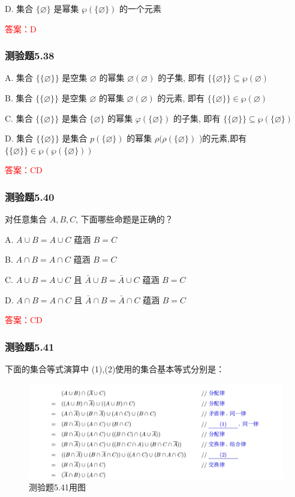 \documentclass[UTF8, heading=true]{ctexart}
\begin{document}
D. 
集合 $\{\varnothing\}$ 是幂集 $\wp(\{\varnothing\})$ 的一个元素

\textcolor{red}{答案：D}

\subsubsection{测验题5.38}
A. 
集合 $\{\{\varnothing\}\}$ 是空集 $\varnothing$ 的幂集 $\varnothing(\varnothing)$ 的子集, 即有 $\{\{\varnothing\}\} \subseteq \wp(\varnothing)$

B. 
集合 $\{\{\varnothing\}\}$ 是空集 $\varnothing$ 的幂集 $\varnothing(\varnothing)$ 的元素, 即有 $\{\{\varnothing\}\} \in \wp(\varnothing)$

C. 
集合 $\{\{\varnothing\}\}$ 是集合 $\{\varnothing\}$ 的幂集 $\varphi(\{\varnothing\})$ 的子集, 即有 $\{\{\varnothing\}\} \subseteq \wp(\{\varnothing\})$

D. 
集合 $\{\{\varnothing\}\}$ 是集合 $p(\{\varnothing\})$ 的幂集 $\rho(\rho(\{\varnothing\})$ )的元素,即有 $\{\{\varnothing\}\} \in \wp(\wp(\{\varnothing\}))$

\textcolor{red}{答案：CD}

\subsubsection{测验题5.40}
对任意集合 $A, B, C$, 下面哪些命题是正确的？

A. $ A \cup B=A \cup C$ 蕴涵 $B=C$

B. $A \cap B=A \cap C$ 蕴涵 $B=C$

C. $A \cup B=A \cup C$ 且 $\bar{A} \cup B=\bar{A} \cup C$ 蕴涵 $B=C$

D. $A \cap B=A \cap C$ 且 $\bar{A} \cap B=\bar{A} \cap C$ 蕴涵 $B=C$

\textcolor{red}{答案：CD}


\subsubsection{测验题5.41}
下面的集合等式演算中 (1),(2)使用的集合基本等式分别是：
\begin{figure}[htbp]
    \centering
    \includegraphics[width=1\textwidth]{5.41.jpg} %
    \caption{测验题5.41用图}
\end{figure}
\end{document}
